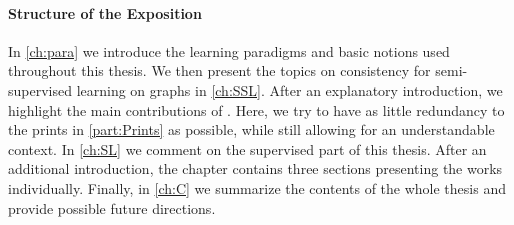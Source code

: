\paragraph{Structure of the Exposition} In \cref{ch:para} we introduce the learning paradigms and basic notions used throughout this thesis. We then present the topics on consistency for semi-supervised learning on graphs in \cref{ch:SSL}. After an explanatory introduction, we highlight the main contributions of \cite{roith2022continuum,bungert2021uniform}. Here, we try to have as little redundancy to the prints in \cref{part:Prints} as possible, while still allowing for an understandable context. In \cref{ch:SL} we comment on the supervised part of this thesis. After an additional introduction, the chapter contains three sections presenting the works \cite{kabri2023resolution,bungert2021clip,bungert2022bregman} individually. Finally, in \cref{ch:C} we summarize the contents of the whole thesis and provide possible future directions.

